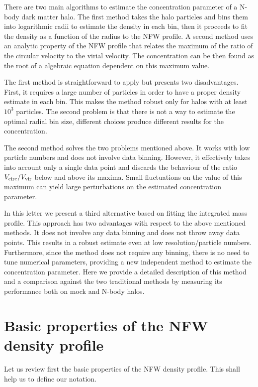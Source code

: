 \documentclass[a4,useAMS,usenatbib,usegraphicx]{mn2e}
\begin{document}
There are two main algorithms to estimate the concentration parameter
of a N-body dark matter halo. 
The first method takes the halo particles and bins them into
logarithmic radii to estimate the density in each bin, then it 
proceeds to fit the density as a function of the radius to the NFW
profile.  
A second method uses an analytic property of the NFW profile
that relates the maximum of the ratio of the circular velocity to the
virial velocity.  The concentration can be then found as the root of a
algebraic equation dependent on this maximum value.

The first method is straightforward to apply but presents two
disadvantages.  
First, it requires a large number of particles in
order to have a proper density estimate in each bin.  
This makes the method robust only for halos with at least $10^3$ particles.  
The second problem is that there is not a way to estimate the optimal
radial bin size, different choices produce different results for the
concentration.

The second method solves the two problems mentioned above.  
It works with low particle numbers and does not involve data binning.  
However, it effectively takes into account only a single data point and
discards the behaviour of the ratio $V_{\rm circ}/V_{\rm vir}$ below
and above its maxima.  
Small fluctuations on the value of this maximum can yield large
perturbations on the estimated concentration parameter.  

In this letter we present a third alternative based on fitting the
integrated mass profile.
This approach has two advantages with respect to the above mentioned
methods.  
It does not involve any data binning and does not throw away data
points. 
This results in a robust estimate even at low resolution/particle
numbers.   
Furthermore, since the method does not require any binning, there is
no need to tune numerical parameters, providing a new independent
method to estimate the concentration parameter. 
Here we provide a detailed description of this method and a
comparison against the two traditional methods by measuring its
performance both on mock and N-body halos.





\section{Basic properties of the NFW density profile}
\label{sec:basics}

Let us review first the basic properties of the NFW density profile.
This shall help us to define our notation.
\end{document}

